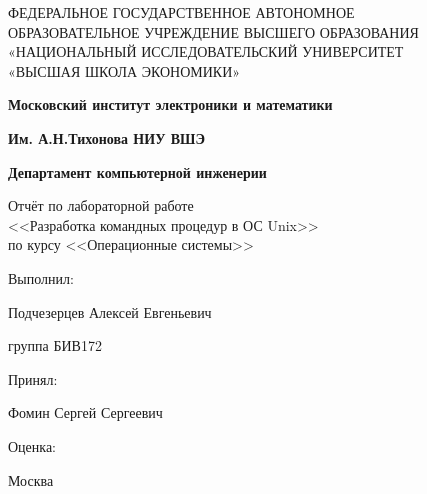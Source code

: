 \begin{titlepage}
	\begin{center}
		ФЕДЕРАЛЬНОЕ  ГОСУДАРСТВЕННОЕ АВТОНОМНОЕ \\
		ОБРАЗОВАТЕЛЬНОЕ УЧРЕЖДЕНИЕ ВЫСШЕГО ОБРАЗОВАНИЯ\\
		«НАЦИОНАЛЬНЫЙ ИССЛЕДОВАТЕЛЬСКИЙ УНИВЕРСИТЕТ\\
		«ВЫСШАЯ ШКОЛА ЭКОНОМИКИ»
	\end{center}
	
	\begin{center}
		\textbf{Московский институт электроники и математики}
		
		\textbf{Им. А.Н.Тихонова НИУ ВШЭ}
		
		\textbf{Департамент компьютерной инженерии}
	\end{center}	
	\vspace{6ex}
	\begin{center}
	Отчёт по лабораторной работе \\
	<<Разработка командных процедур в ОС Unix>> \\ 
	 по курсу <<Операционные системы>>
	\end{center}	
	\vspace{5ex}
	
	Выполнил:
	
	Подчезерцев Алексей Евгеньевич 
	
	группа БИВ172
	
	\vspace{5ex}
	
	Принял:
	
	Фомин Сергей Сергеевич 
	
	\vspace{5ex}
	
	Оценка:


	\vfill
	\begin{center}
		Москва \the\year
	\end{center}
\end{titlepage}